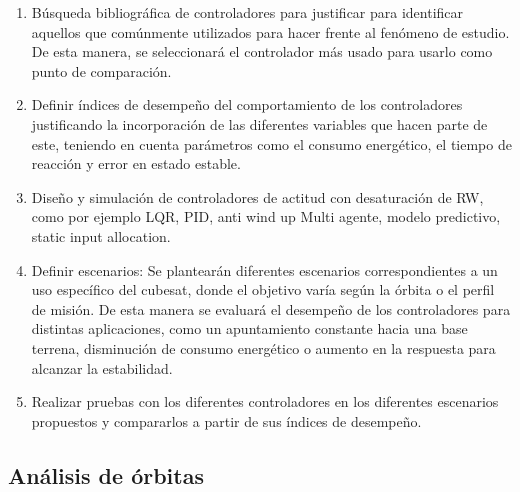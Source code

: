 \begin{enumerate}[label=\alph*)]
	
	\item	Búsqueda bibliográfica de controladores para justificar para identificar aquellos que comúnmente utilizados para hacer frente al fenómeno de estudio. De esta manera, se seleccionará el controlador más usado para usarlo como punto de comparación. 
	\item	Definir índices de desempeño del comportamiento de los controladores justificando la incorporación de las diferentes variables que hacen parte de este, teniendo en cuenta parámetros como el consumo energético, el tiempo de reacción y error en estado estable.
	\item	Diseño y simulación de controladores de actitud con desaturación de RW, como por ejemplo LQR, PID, anti wind up Multi agente, modelo predictivo, static input allocation.
	\item	Definir escenarios: Se plantearán diferentes escenarios correspondientes a un uso específico del cubesat, donde el objetivo varía según la órbita o el perfil de misión. De esta manera se evaluará el desempeño de los controladores para distintas aplicaciones, como un apuntamiento constante hacia una base terrena, disminución de consumo energético o aumento en la respuesta para alcanzar la estabilidad.
	\item	Realizar pruebas con los diferentes controladores en los diferentes escenarios propuestos y compararlos a partir de sus índices de desempeño.
	
	
\end{enumerate}
 
 \subsection{Análisis de órbitas} 

